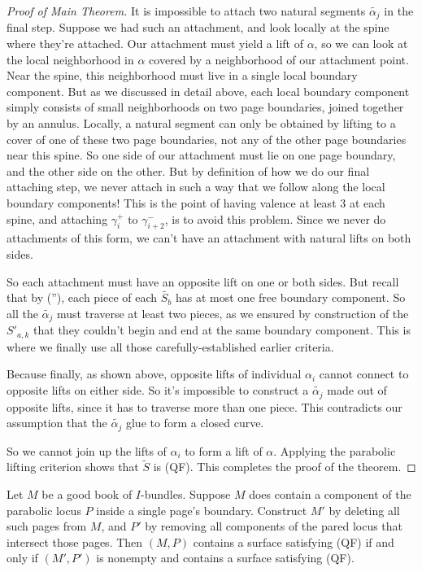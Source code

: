\begin{proof}[Proof of Main Theorem]
It is impossible to attach two natural segments $\widetilde{\alpha_j}$ in the final
step.  Suppose we had such an attachment, and look locally at the spine where
they're attached. Our attachment must yield a lift of $\alpha$, so we can look
at the local neighborhood in $\alpha$ covered by a neighborhood of our
attachment point.  Near the spine, this neighborhood must live in a single
local boundary component. But as we discussed in detail above, each local
boundary component simply consists of small neighborhoods on two page
boundaries, joined together by an annulus. Locally, a natural segment can only
be obtained by lifting to a cover of one of these two page boundaries, not any
of the other page boundaries near this spine. So one side of our attachment
must lie on one page boundary, and the other side on the other. But by
definition of how we do our final attaching step, we never attach in such a way
that we follow along the local boundary components! This is the point of having
valence at least 3 at each spine, and attaching $\gamma_i^+$ to
$\gamma_{i+2}^-$, is to avoid this problem. Since we never do attachments of
this form, we can't have an attachment with natural lifts on both sides.

So each attachment must have an opposite lift on one or both sides. But recall
that by (\dag''), each piece of each $\widetilde{S_b}$ has at most one free boundary
component. So all the $\widetilde{\alpha_j}$ must traverse at least two pieces, as we
ensured by construction of the $S'_{a,k}$ that they couldn't begin and end at the
same boundary component. This is where we finally use all those
carefully-established earlier criteria.

Because finally, as shown above, opposite lifts of individual $\alpha_i$ cannot
connect to opposite lifts on either side. So it's impossible to construct
a $\widetilde{\alpha_j}$ made out of opposite lifts, since it has to traverse
more than one piece.  This contradicts our assumption that the
$\widetilde{\alpha_j}$ glue to form a closed curve.

So we cannot join up the lifts of $\alpha_i$ to form a lift of $\alpha$.
Applying the parabolic lifting criterion shows that $\widetilde{S}$ is (QF).
This completes the proof of the theorem.

\end{proof}

\begin{thm}

Let $M$ be a good book of $I$-bundles.  Suppose $M$ does contain a component of
the parabolic locus $P$ inside a single page's boundary.  Construct $M'$ by
deleting all such pages from $M$, and $P'$ by removing all components of the
pared locus that intersect those pages. Then $(M,P)$ contains a surface
satisfying (QF) if and only if $(M',P')$ is nonempty and contains
a surface satisfying (QF).

\end{thm}

